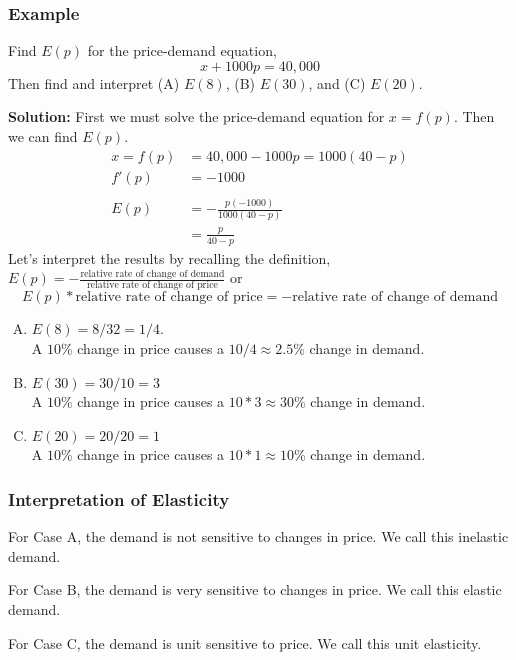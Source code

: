 \documentclass[14pt]{extarticle}
\begin{document}
\subsubsection{Example}
Find $E(p)$ for the price-demand equation, $$x + 1000p =40,000$$
Then find and interpret (A) $E(8)$, (B) $E(30)$, and (C) $E(20)$.

\textbf{Solution:} First we must solve the price-demand equation for $x=f(p)$. Then we can find $E(p)$.
\begin{align*}
	x=f(p) &= 40,000 - 1000p = 1000(40-p) \\
	f'(p) &= -1000 \\\\
	E(p) &= -\frac{p(-1000)}{1000(40-p)} \\
	&= \frac{p}{40-p}
\end{align*}
Let's interpret the results by recalling the definition, $E(p) = -\frac{\text{relative rate of change of demand}}{\text{relative rate of change of price}}$ or $$E(p) * \text{relative rate of change of price} = -\text{relative rate of change of demand}$$


\begin{enumerate}[(A)]
	\item $E(8) =  8/32 = 1/4$.\\
	A $10$\% change in price causes a $10/4\approx 2.5$\% change in demand.
	\item $E(30) = 30/10 = 3$ \\
	A $10$\% change in price causes a $10*3\approx 30$\% change in demand.
	\item $E(20) = 20/20 = 1$ \\
	A $10$\% change in price causes a $10*1\approx 10$\% change in demand.
\end{enumerate}

\subsubsection{Interpretation of Elasticity}
For Case A, the demand is not sensitive to changes in price. We call this inelastic demand.

For Case B, the demand is very sensitive to changes in price. We call this elastic demand.

For Case C, the demand is unit sensitive to price. We call this unit elasticity.
\end{document}
